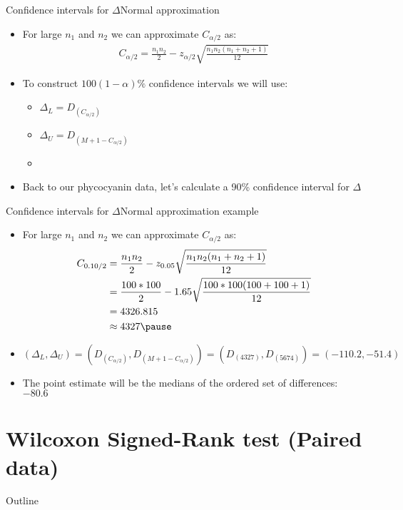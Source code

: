 \documentclass[xcolor=dvipsnames]{beamer}
\begin{document}
\begin{frame}{Confidence intervals for $\Delta$}{Normal approximation}
	\begin{itemize}
		\item For large $n_1$ and $n_2$ we can approximate $C_{\alpha / 2}$ as:
		\begin{gather*}
		C_{\alpha / 2} = \frac{n_1 n_2}{2} - z_{\alpha / 2} \sqrt{\frac{n_1 n_2(n_1+n_2+1)}{12}}
		\end{gather*} \pause
		\item To construct $100(1-\alpha) \%$ confidence intervals we will use:
		\begin{itemize}
			\item $\Delta_L = D_{(C_{\alpha / 2})}$
			\item $\Delta_U = D_{(M + 1 - C_{\alpha / 2})}$
			\item[]
		\end{itemize} \pause
	\item Back to our phycocyanin data, let's calculate a 90\% confidence interval for $\Delta$
	\end{itemize}
\end{frame}

\begin{frame}{Confidence intervals for $\Delta$}{Normal approximation example}
\begin{itemize}
	\item For large $n_1$ and $n_2$ we can approximate $C_{\alpha / 2}$ as: \pause
	\begin{align*}
	C_{0.10 / 2} &= \frac{n_1 n_2}{2} - z_{0.05} \sqrt{\frac{n_1 n_2(n_1+n_2+1)}{12}} \\
	&=\frac{100*100}{2} - 1.65 \sqrt{\frac{100*100(100+100+1)}{12}} \\
	&= 4326.815 \\
	&\approx 4327 \pause
	\end{align*}
	\item $(\Delta_L, \Delta_U) = \left(D_{(C_{\alpha / 2})}, D_{(M + 1 - C_{\alpha / 2})} \right) = \left(D_{(4327)}, D_{(5674)}\right) = (-110.2, -51.4)$ \pause
	\item The point estimate will be the medians of the ordered set of differences: $-80.6$
\end{itemize}
\end{frame}

\section{Wilcoxon Signed-Rank test (Paired data)}
\begin{frame}{Outline}
\tableofcontents[currentsection,subsectionstyle=show/shaded/hide]
\end{frame}
\end{document}
